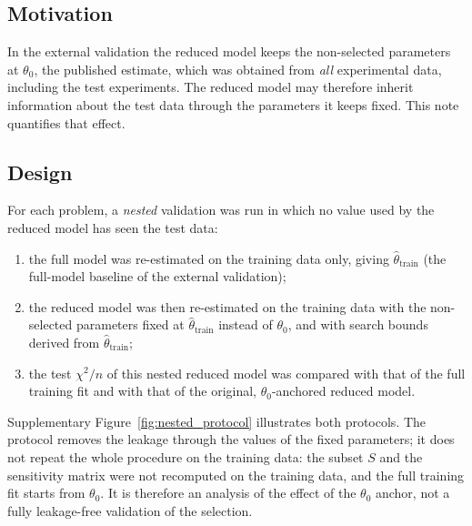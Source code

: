 
\subsection*{Motivation}

In the external validation the reduced model keeps the non-selected parameters at $\theta_0$, the published estimate, which was obtained from \emph{all} experimental data, including the test experiments. The reduced model may therefore inherit information about the test data through the parameters it keeps fixed. This note quantifies that effect.

\subsection*{Design}

For each problem, a \emph{nested} validation was run in which no value used by the reduced model has seen the test data:
\begin{enumerate}\itemsep0pt
  \item the full model was re-estimated on the training data only, giving $\hat\theta_{\mathrm{train}}$ (the full-model baseline of the external validation);
  \item the reduced model was then re-estimated on the training data with the non-selected parameters fixed at $\hat\theta_{\mathrm{train}}$ instead of $\theta_0$, and with search bounds derived from $\hat\theta_{\mathrm{train}}$;
  \item the test $\chi^2/n$ of this nested reduced model was compared with that of the full training fit and with that of the original, $\theta_0$-anchored reduced model.
\end{enumerate}
Supplementary Figure~\ref{fig:nested_protocol} illustrates both protocols. The protocol removes the leakage through the values of the fixed parameters; it does not repeat the whole procedure on the training data: the subset $S$ and the sensitivity matrix were not recomputed on the training data, and the full training fit starts from $\theta_0$. It is therefore an analysis of the effect of the $\theta_0$ anchor, not a fully leakage-free validation of the selection.

